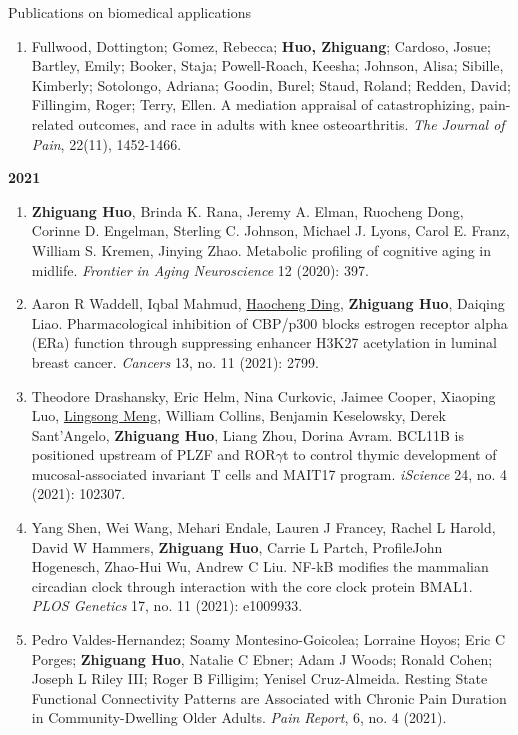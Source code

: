 \documentclass{resume} %
\begin{document}
\begin{rSection}{Publications on biomedical applications}
\begin{enumerate}[noitemsep,topsep=0pt, resume]
\item  
Fullwood, Dottington; Gomez, Rebecca; {\bf Huo, Zhiguang}; Cardoso, Josue; Bartley, Emily; Booker, Staja; Powell-Roach, Keesha; Johnson, Alisa; Sibille, Kimberly; Sotolongo, Adriana; Goodin, Burel; Staud, Roland; Redden, David; Fillingim, Roger; Terry, Ellen. 
A mediation appraisal of catastrophizing, pain-related outcomes, and race in adults with knee osteoarthritis. 
\emph{The Journal of Pain}, 22(11), 1452-1466.

\end{enumerate}


\textbf{2021}
\begin{enumerate}[noitemsep,topsep=0pt, resume]

\item  {\bf Zhiguang Huo}, Brinda K. Rana, Jeremy A. Elman, Ruocheng Dong, Corinne D. Engelman, Sterling C. Johnson, Michael J. Lyons, Carol E. Franz, William S. Kremen, Jinying Zhao.
Metabolic profiling of cognitive aging in midlife.
\emph{Frontier in Aging Neuroscience} 12 (2020): 397.

\item
Aaron R Waddell, Iqbal Mahmud, \underline{Haocheng Ding}, {\bf Zhiguang Huo}, Daiqing Liao. 
Pharmacological inhibition of CBP/p300 blocks estrogen receptor alpha (ERa) function through suppressing enhancer H3K27 acetylation in luminal breast cancer.
\emph{Cancers} 13, no. 11 (2021): 2799.

\item
Theodore Drashansky, Eric Helm, Nina Curkovic, Jaimee Cooper, Xiaoping Luo, \underline{Lingsong Meng}, William Collins, Benjamin Keselowsky, Derek Sant'Angelo, {\bf Zhiguang Huo}, Liang Zhou, Dorina Avram.
BCL11B is positioned upstream of PLZF and ROR$\gamma$t to control thymic development of mucosal-associated invariant T cells and MAIT17 program.
\emph{iScience}  24, no. 4 (2021): 102307.

\item  
Yang Shen, Wei Wang, Mehari Endale, Lauren J Francey, Rachel L Harold, David W Hammers, {\bf Zhiguang Huo}, Carrie L Partch, ProfileJohn Hogenesch, Zhao-Hui Wu, Andrew C Liu.
NF-kB modifies the mammalian circadian clock through interaction with the core clock protein BMAL1.
\emph{PLOS Genetics} 17, no. 11 (2021): e1009933.


\item 
 Pedro Valdes-Hernandez; Soamy Montesino-Goicolea; Lorraine Hoyos; Eric C Porges; {\bf Zhiguang Huo}, Natalie C Ebner; Adam J Woods; Ronald Cohen; Joseph L Riley III; Roger B Filligim; Yenisel Cruz-Almeida. 
 Resting State Functional Connectivity Patterns are Associated with Chronic Pain Duration in Community-Dwelling Older Adults. 
\emph{Pain Report},  6, no. 4 (2021).



\end{enumerate}
\end{rSection}
\end{document}
